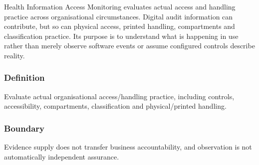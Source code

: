 Health Information Access Monitoring evaluates actual access and handling practice across organisational circumstances. Digital audit information can contribute, but so can physical access, printed handling, compartments and classification practice. Its purpose is to understand what is happening in use rather than merely observe software events or assume configured controls describe reality.

\subsubsection*{Definition}

Evaluate actual organisational access/\allowbreak{}handling practice, including controls, accessibility, compartments, classification and physical/\allowbreak{}printed handling.

\subsubsection*{Boundary}

Evidence supply does not transfer business accountability, and observation is not automatically independent assurance.

